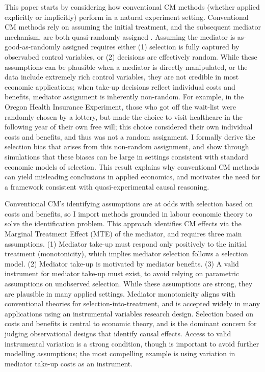 This paper starts by considering how conventional CM methods (whether applied explicitly or implicitly) perform in a natural experiment setting.
Conventional CM methods rely on assuming the initial treatment, and the subsequent mediator mechanism, are both quasi-randomly assigned \citep{imai2010identification}.
Assuming the mediator is as-good-as-randomly assigned requires either (1) selection is fully captured by observabed control variables, or (2) decisions are effectively random.
While these assumptions can be plausible when a mediator is directly manipulated, or the data include extremely rich control variables, they are not credible in most economic applications; when take-up decisions reflect individual costs and benefits, mediator assignment is inherently non-random.
For example, in the Oregon Health Insurance Experiment, those who got off the wait-list were randomly chosen by a lottery, but made the choice to visit healthcare in the following year of their own free will; this choice considered their own individual costs and benefits, and thus was not a random assignment.
I formally derive the selection bias that arises from this non-random assignment, and show through simulations that these biases can be large in settings consistent with standard economic models of selection.
This result explains why conventional CM methods can yield misleading conclusions in applied economics, and motivates the need for a framework consistent with quasi-experimental causal reasoning.

Conventional CM's identifying assumptions are at odds with selection based on costs and benefits, so I import methods grounded in labour economic theory to solve the identification problem.
This approach identifies CM effects via the Marginal Treatment Effect (MTE) of the mediator, and requires three main assumptions.
(1) Mediator take-up must respond only positively to the initial treatment (monotonicity), which implies mediator selection follows a selection model.
(2) Mediator take-up is motivated by mediator benefits.
(3) A valid instrument for mediator take-up must exist, to avoid relying on parametric assumptions on unobserved selection.
While these assumptions are strong, they are plausible in many applied settings.
Mediator monotonicity aligns with conventional theories for selection-into-treatment, and is accepted widely in many applications using an instrumental variables research design.
Selection based on costs and benefits is central to economic theory, and is the dominant concern for judging observational designs that identify causal effects.
Access to valid instrumental variation is a strong condition, though is important to avoid further modelling assumptions; the most compelling example is using variation in mediator take-up costs as an instrument.

